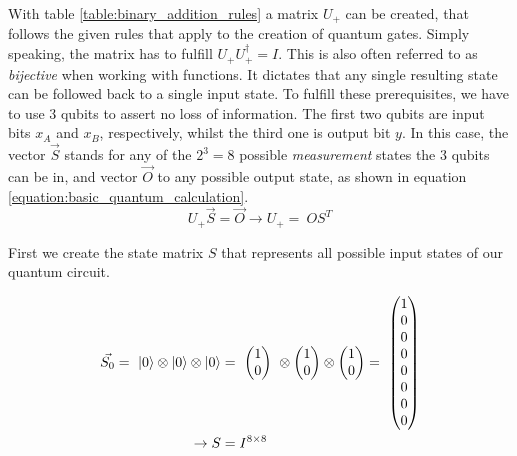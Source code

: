 With table \ref{table:binary_addition_rules} a matrix $U_{+}$ can be created, that follows the given rules that apply to the creation of quantum gates\cite{scherer_quantum_2019}. Simply speaking, the matrix has to fulfill $U_{+}U_{+}^\dagger = I$. This is also often referred to as \emph{bijective} when working with functions. It dictates that any single resulting state can be followed back to a single input state. To fulfill these prerequisites, we have to use 3 qubits to assert no loss of information. The first two qubits are input bits $x_A$ and $x_B$, respectively, whilst the third one is output bit $y$. In this case, the vector $\vec{S}$ stands for any of the $2^3 = 8$ possible \emph{measurement} states the 3 qubits can be in, and vector $\vec{O}$ to any possible output state, as shown in equation \ref{equation:basic_quantum_calculation}.\\

\begin{equation}
    U_{+}\vec{S} = \vec{O} \rightarrow U_{+} =\ OS^T
    \label{equation:basic_quantum_calculation}
\end{equation}

First we create the state matrix $S$ that represents all possible input states of our quantum circuit.

\begin{equation}
    \begin{split}
        \vec{S_0} =\ \ket{0} \otimes \ket{0} \otimes \ket{0} &=\ \begin{pmatrix} 1 \\ 0\end{pmatrix}\ \otimes \begin{pmatrix}1 \\ 0\end{pmatrix} \otimes \begin{pmatrix}1 \\ 0\end{pmatrix} =\ \begin{pmatrix}1 \\0 \\0 \\0 \\0 \\0 \\0 \\0 \end{pmatrix}\\
        \rightarrow S &= I^{8\times8}
    \end{split}
    \label{equation:state_matrix_is_identity_matrix}
\end{equation}

